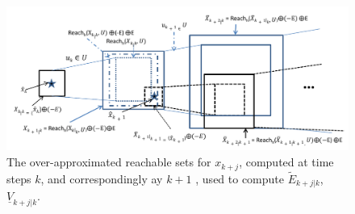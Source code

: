 %
%
%
%
%
%



\begin{figure}
\includegraphics[scale=0.75]{figs/OverReachFigure_NL_scissored.pdf}
\caption{The over-approximated reachable sets for $x_{k+j}$, computed at time steps $k$, and correspondingly ay $k+1$ , used to compute $\tilde{E}_{k+j|k}$, $\underline{V}_{k+j|k}$. }
\label{fig:overreach_NL}
\end{figure}